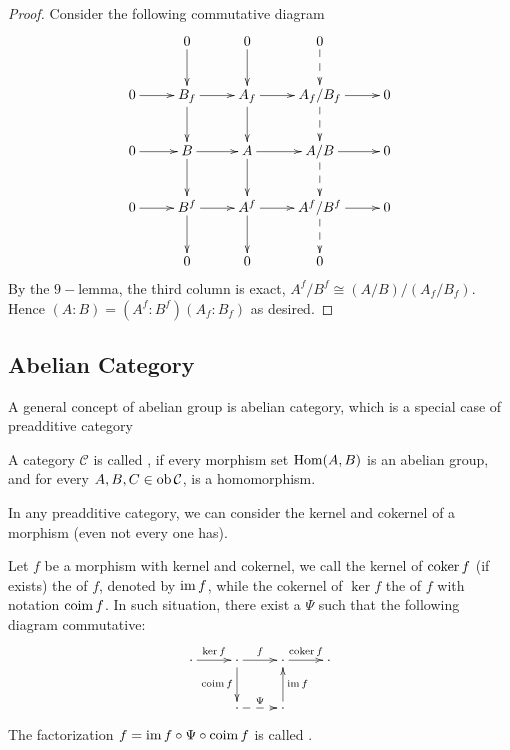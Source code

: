 \begin{proof}
Consider the following commutative diagram
\begin{displaymath}
      \xymatrix{
        & 0\ar[d] &0\ar[d] &0\ar@{-->}[d] & \\
        0\ar[r] & B_f\ar[r]\ar[d] & A_f\ar[r]\ar[d] & {A_f/B_f}\ar[r]\ar@{-->}[d] & 0 \\
        0\ar[r] & B\ar[r]\ar[d] & A\ar[r]\ar[d] & {A/B}\ar[r]\ar@{-->}[d] & 0 \\
        0\ar[r] & B^f\ar[r]\ar[d] & A^f\ar[r]\ar[d] & {A^f/B^f}\ar[r]\ar@{-->}[d] & 0 \\
        & 0 & 0 & 0 &
      }
\end{displaymath}
By the $9-$lemma, the third column is exact, $A^f/B^f\cong (A/B)/(A_f/B_f)$. Hence $(A:B)=(A^f:B^f)(A_f:B_f)$ as desired.
\end{proof}
\subsection{Abelian Category}
A general concept of abelian group is abelian category, which is a special case of preadditive category
\begin{defn}
  A category $\mathcal{C}$ is called , if every morphism set $\operatorname{Hom}(A,B)$ is an abelian group, and for every $A,B,C\in \operatorname{ob}\mathcal{C}$,
  is a homomorphism.
\end{defn}

In any preadditive category, we can consider the kernel and cokernel of a morphism (even not every one has).
\begin{defn}
   Let $f$ be a morphism with kernel and cokernel, we call the kernel of $\operatorname{coker} f$ (if exists) the  of $f$, denoted by $\operatorname{im} f$, while the cokernel of $\ker f$ the  of $f$ with notation $\operatorname{coim} f$. In such situation, there exist a  $\Psi$ such that the following diagram commutative:
     \begin{displaymath}
    \xymatrix{
     \cdot\ar[r]^{\ker f} & \cdot\ar[r]^{f}\ar[d]_{\coim f} &\cdot\ar[r]^{\coker f}  & \cdot\\
                                  & \cdot\ar@{-->}[r]^-{\Psi}        &\cdot\ar[u]_{\im f}       &
    }
   \end{displaymath}
   The factorization $f=\operatorname{im} f \circ \Psi \circ \operatorname{coim} f$ is called .
\end{defn}

